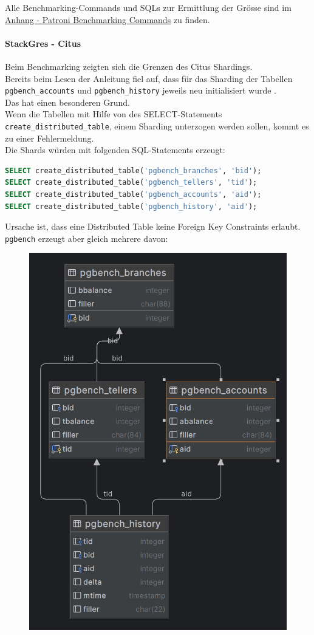 \begin{flushleft}
    Alle Benchmarking-Commands und SQLs zur Ermittlung der Grösse sind im \hyperref[subsec:patroni_benchmarking_commands]{Anhang - Patroni Benchmarking Commands} zu finden.
\end{flushleft}
\begin{flushleft}
    \paragraph{StackGres - Citus}
    Beim Benchmarking zeigten sich die Grenzen des Citus Shardings.\\
    Bereits beim Lesen der Anleitung fiel auf, dass für das Sharding der Tabellen \texttt{pgbench\_accounts} und \texttt{pgbench\_history} jeweils neu initialisiert wurde \cite{6CJFR7RM}.\\
    Das hat einen besonderen Grund.\\
    Wenn die Tabellen mit Hilfe von des SELECT-Statements \texttt{create\_distributed\_table}, einem Sharding unterzogen werden sollen, kommt es zu einer Fehlermeldung.\\
    Die Shards würden mit folgenden SQL-Statements erzeugt:
\lstset{style=gra_codestyle}
\begin{lstlisting}[language=sql, caption=Citus - Benchmarking - Distributed Table Sharding,captionpos=b,label={lst:benchmarking_distributed_table_sharding},breaklines=true]
SELECT create_distributed_table('pgbench_branches', 'bid');
SELECT create_distributed_table('pgbench_tellers', 'tid');
SELECT create_distributed_table('pgbench_accounts', 'aid');
SELECT create_distributed_table('pgbench_history', 'aid');
\end{lstlisting}
    Ursache ist, dass eine Distributed Table keine Foreign Key Constraints erlaubt.\\
    \texttt{pgbench} erzeugt aber gleich mehrere davon:\\
    \begin{figure}[H]
        \centering
        \includegraphics[width=0.5\linewidth]{source/implementation/evaluation/benchmarking/stackgres_citus/pgbench_accounts}

\end{figure}
\end{flushleft}
